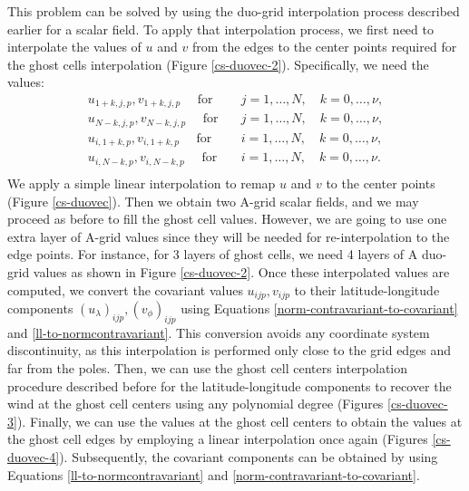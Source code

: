 This problem can be solved by using the duo-grid interpolation process described earlier for a scalar field.
To apply that interpolation process, we first need to interpolate the values of $u$ and $v$ from the
edges to the center points required for the ghost cells interpolation (Figure \ref{cs-duovec-2}).
Specifically, we need the values:
\begin{align*}
	u_{1+k,j,p}, v_{1+k,j,p} \quad \text{ for} \quad &j=1, \ldots, N, \quad k=0, \ldots, \nu,\\
	u_{N-k,j,p}, v_{N-k,j,p} \quad \text{ for} \quad &j=1, \ldots, N, \quad k=0, \ldots, \nu,\\
	u_{i,1+k,p}, v_{i,1+k,p} \quad \text{ for} \quad &i=1, \ldots, N, \quad k=0, \ldots, \nu,\\
	u_{i,N-k,p}, v_{i,N-k,p} \quad \text{ for} \quad &i=1, \ldots, N, \quad k=0, \ldots, \nu.\\
\end{align*}
We apply a simple linear interpolation to remap $u$ and $v$ to the center points (Figure \ref{cs-duovec}).
Then we obtain two A-grid scalar fields, and we may proceed as before to fill the ghost cell values.
However, we are going to use one extra layer of A-grid values since they will be needed for re-interpolation to the edge points.
For instance, for 3 layers of ghost cells, we need 4 layers of A duo-grid values as shown in Figure \ref{cs-duovec-2}.
Once these interpolated values are computed, we convert the covariant values $u_{ijp}, v_{ijp}$
to their latitude-longitude components $(u_{\lambda})_{ijp}, (v_{\phi})_{ijp}$ using Equations \eqref{norm-contravariant-to-covariant} and
\eqref{ll-to-normcontravariant}.
This conversion avoids any coordinate system discontinuity, as this interpolation is performed only close to the grid edges and far from the poles.
Then, we can use the ghost cell centers interpolation procedure described before for the latitude-longitude components
to recover the wind at the ghost cell centers using any polynomial degree (Figures \ref{cs-duovec-3}).
Finally, we can use the values at the ghost cell centers to obtain the values at the ghost cell edges
by employing a linear interpolation once again (Figures \ref{cs-duovec-4}).
Subsequently, the covariant components can be obtained by using Equations \eqref{ll-to-normcontravariant} and \eqref{norm-contravariant-to-covariant}.

